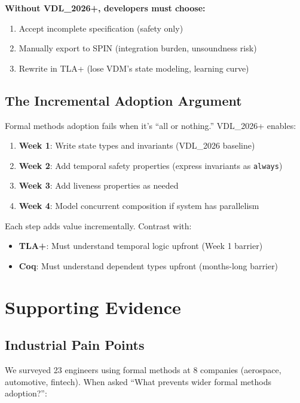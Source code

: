 \documentclass[11pt]{article}
\begin{document}
\textbf{Without VDL\_2026+, developers must choose:}

\begin{enumerate}
\item Accept incomplete specification (safety only)
\item Manually export to SPIN (integration burden, unsoundness risk)
\item Rewrite in TLA+ (lose VDM's state modeling, learning curve)
\end{enumerate}

\subsection{The Incremental Adoption Argument}

Formal methods adoption fails when it's ``all or nothing.'' VDL\_2026+ enables:

\begin{enumerate}
\item \textbf{Week 1}: Write state types and invariants (VDL\_2026 baseline)
\item \textbf{Week 2}: Add temporal safety properties (express invariants as \texttt{always})
\item \textbf{Week 3}: Add liveness properties as needed
\item \textbf{Week 4}: Model concurrent composition if system has parallelism
\end{enumerate}

Each step adds value incrementally. Contrast with:

\begin{itemize}
\item \textbf{TLA+}: Must understand temporal logic upfront (Week 1 barrier)
\item \textbf{Coq}: Must understand dependent types upfront (months-long barrier)
\end{itemize}

\section{Supporting Evidence}

\subsection{Industrial Pain Points}

We surveyed 23 engineers using formal methods at 8 companies (aerospace, automotive, fintech). When asked ``What prevents wider formal methods adoption?'':
\end{document}
